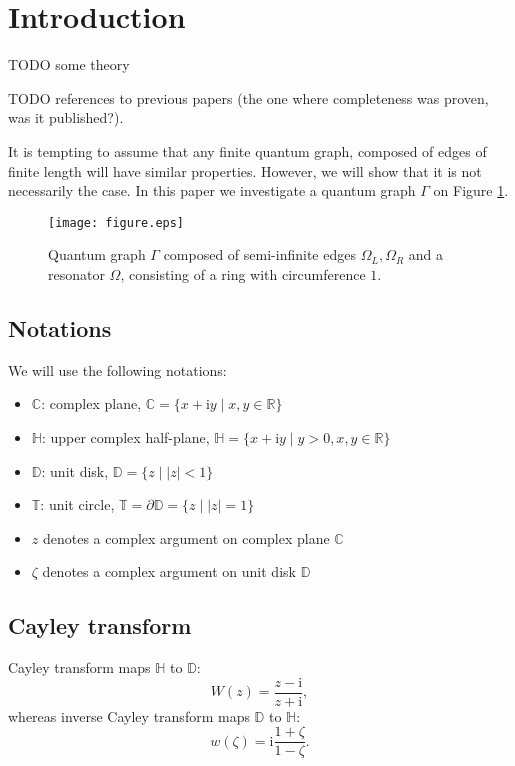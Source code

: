 \documentclass{birkjour}
\theoremstyle{definition}
\theoremstyle{remark}
\numberwithin{equation}{section}
\begin{document}
\section{Introduction}

TODO some theory

TODO references to previous papers (the one where completeness was proven, was it published?).

It is tempting to assume that any finite quantum graph, composed of edges of finite length will have similar properties.
However, we will show that it is not necessarily the case. In this paper we investigate a quantum graph $\Gamma$ on Figure \ref{fig:graph}.

\begin{figure}
\texttt{[image: figure.eps]}
\caption{Quantum graph $\Gamma$ composed of semi-infinite edges $\Omega_L, \Omega_R$ and a resonator $\Omega$, consisting of a ring with circumference $1$.}
\label{fig:graph}
\end{figure}

\subsection{Notations}
We will use the following notations:
\begin{itemize}
\item $\mathbb{C}$: complex plane, $\mathbb{C} = \{ x + \mathrm{i}
y \mid x, y \in \mathbb{R} \}$
\item $\mathbb{H}$: upper complex half-plane, $\mathbb{H} =
\{ x + \mathrm{i} y \mid y > 0, x, y \in \mathbb{R} \}$
\item $\mathbb{D}$: unit disk, $\mathbb{D} = \{ z \mid
\left|z\right| < 1 \}$
\item $\mathbb{T}$: unit circle, $\mathbb{T} = \partial \mathbb{D}
=  \{z \mid \left|z\right| = 1 \}$
\item $z$ denotes a complex argument on complex plane $\mathbb{C}$
\item $\zeta$ denotes a complex argument on unit disk $\mathbb{D}$
\end{itemize}

\subsection{Cayley transform}

Cayley transform maps $\mathbb{H}$ to $\mathbb{D}$:
\[
W(z) = \frac{z - \mathrm{i}}{z + \mathrm{i}},
\]
whereas inverse Cayley transform maps $\mathbb{D}$ to
$\mathbb{H}$:
\begin{equation}\label{eq:cayley_inverse}
w(\zeta) = \mathrm{i} \frac{1 + \zeta}{1 - \zeta}.
\end{equation}
\end{document}

